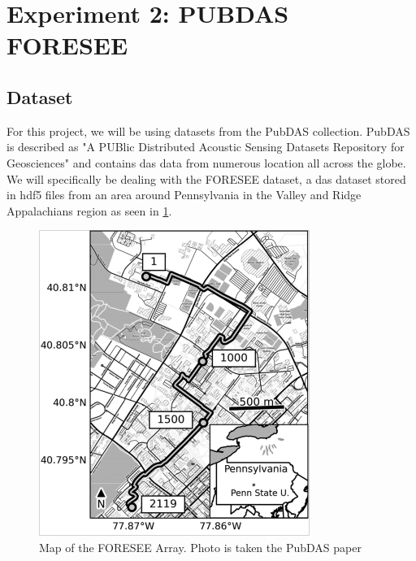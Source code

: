 \section{Experiment 2: PUBDAS FORESEE}

\subsection{Dataset}

For this project, we will be using datasets from the PubDAS \cite{spica2023pubdas} collection. PubDAS is described as "A PUBlic Distributed Acoustic Sensing Datasets Repository for Geosciences" and contains \acrshort{das} data from numerous location all across the globe. We will specifically be dealing with the FORESEE dataset, a \acrshort{das} dataset stored in \acrshort{hdf5} files from an area around Pennsylvania in the Valley and Ridge Appalachians region  as seen in \ref{fig:foresee}. \\

\begin{figure}[!h]
    \centering
    \includegraphics[width=0.5\linewidth]{figures/foresee.png}
    \caption{Map of the FORESEE Array. Photo is taken the PubDAS paper \cite{spica2023pubdas}}
    \label{fig:foresee}
\end{figure}

